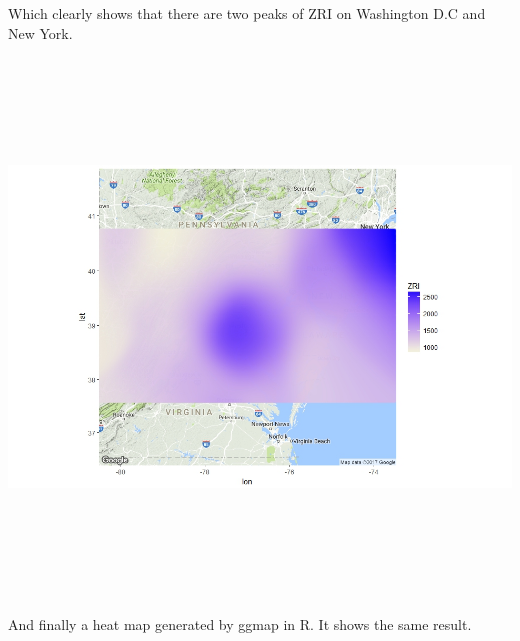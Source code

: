 \documentclass[a4paper]{article}
\begin{document}
Which clearly shows that there are two peaks of ZRI on Washington D.C and New York.\\
\includegraphics[width=15cm,height=15cm,keepaspectratio]{heatmap}\\
And finally a heat map generated by ggmap in R. It shows the same result.
\end{document}
